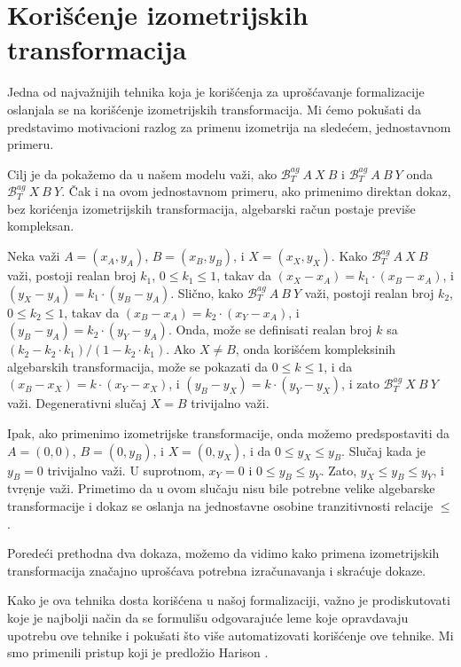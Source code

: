 \documentclass[a4paper, 12pt]{article}
\newcommand{\agbett}[3]{\ensuremath{\mathcal{B}_T^{\mathit{ag}}\ #1\ #2\ #3}}
\begin{document}
\section{Kori\v s\'cenje izometrijskih transformacija}
\label{sec:iso}
Jedna od najva\v znijih tehnika koja je kori\v s\'cenja za upro\v
s\'cavanje formalizacije oslanjala se na kori\v s\'cenje
izometrijskih transformacija. Mi \'cemo poku\v sati da predstavimo
motivacioni razlog za primenu izometrija na slede\'cem,
jednostavnom primeru.

Cilj je da poka\v zemo da u na\v sem modelu va\v zi, ako
$\agbett{A}{X}{B}$ i $\agbett{A}{B}{Y}$ onda$\agbett{X}{B}{Y}$. \v
Cak i na ovom jednostavnom primeru, ako primenimo direktan dokaz,
bez kori\s\'cenja izometrijskih transformacija, algebarski ra\v
cun postaje previ\v se kompleksan.

Neka va\v zi $A=(x_A, y_A)$, $B=(x_B, y_B)$, i $X=(x_X, y_X)$.
Kako $\agbett{A}{X}{B}$ va\v zi, postoji realan broj $k_1$, $0 \le
k_1 \le 1$, takav da $(x_X - x_A) = k_1 \cdot (x_B - x_A)$, i
$(y_X - y_A) = k_1 \cdot (y_B - y_A)$. Sli\v cno, kako
$\agbett{A}{B}{Y}$ va\v zi, postoji realan broj $k_2$, $0 \le k_2
\le 1$, takav da $(x_B - x_A) = k_2 \cdot (x_Y - x_A)$, i $(y_B -
y_A) = k_2 \cdot (y_Y - y_A)$. Onda, mo\v ze se definisati realan
broj $k$ sa $(k_2 - k_2\cdot k_1) / (1-k_2\cdot k_1).$ Ako $X\neq
B$, onda kori\v s\'cem kompleksinih algebarskih transformacija,
mo\v ze se pokazati da $0 \le k \le 1$, i da $(x_B - x_X) = k
\cdot (x_Y - x_X)$, i $(y_B - y_X) = k \cdot (y_Y - y_X)$, i zato
$\agbett{X}{B}{Y}$ va\v zi. Degenerativni slu\v caj $X=B$
trivijalno va\v zi.

Ipak, ako primenimo izometrijske transformacije, onda mo\v zemo
predspostaviti da $A=(0, 0)$, $B=(0, y_B)$, i $X=(0, y_X)$, i da
$0 \le y_X \le y_B$. Slu\v caj kada je $y_B = 0$ trivijalno va\v
zi. U suprotnom, $x_Y = 0$ i $0 \le y_B \le y_Y$. Zato, $y_X \le
y_B \le y_Y$, i tvr\d enje va\v zi. Primetimo da u ovom slu\v caju
nisu bile potrebne velike algebarske transformacije i dokaz se
oslanja na jednostavne osobine tranzitivnosti relacije $\le$.

Porede\'ci prethodna dva dokaza, mo\v zemo da vidimo kako primena 
izometrijskih transformacija zna\v cajno upro\v s\'cava potrebna 
izra\v cunavanja i skra\' cuje dokaze.

Kako je ova tehnika dosta kori\v s\'cena u na\v soj formalizaciji,
va\v zno je prodiskutovati koje je najbolji na\v cin da se formuli\v su
odgovaraju\'ce leme koje opravdavaju upotrebu ove tehnike i poku\v sati 
\v sto vi\v se automatizovati kori\v s\'cenje ove tehnike. Mi smo
primenili pristup koji je predlo\v zio Harison \cite{wlog}.
\end{document}
